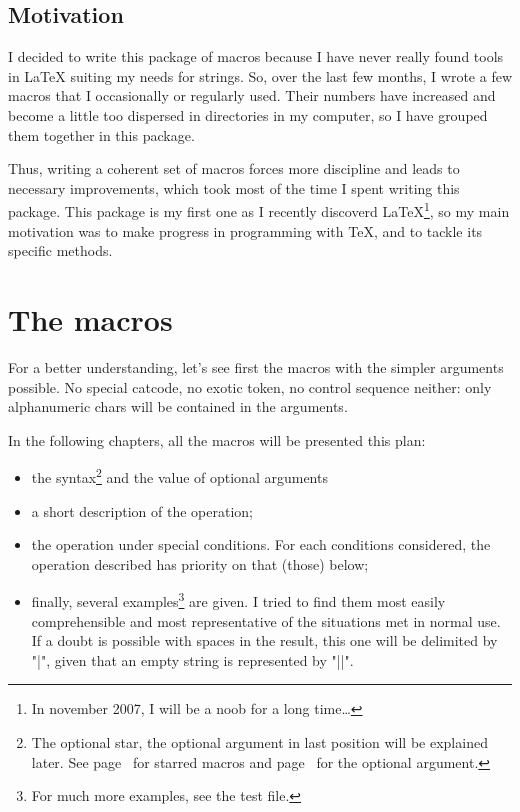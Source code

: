 \documentclass[english,a4paper,10pt]{article}
\newcommand\guill[1]{"#1"}
\begin{document}
\subsection{Motivation}
I decided to write this package of macros because I have never really found tools in \LaTeX{} suiting my needs for strings. So, over the last few months, I wrote a few macros that I occasionally or regularly used. Their numbers have increased and become a little too dispersed in directories in my computer, so I have grouped them together in this package.

Thus, writing a coherent set of macros forces more discipline and leads to necessary improvements, which took most of the time I spent writing this package. This package is my first one as I recently discoverd \LaTeX{}\footnote{In november 2007, I will be a noob for a long time\ldots}, so my main motivation was to make progress in programming with \TeX, and to tackle its specific methods.

\section{The macros}
For a better understanding, let's see first the macros with the simpler arguments possible. No special catcode, no exotic token, no control sequence neither: only alphanumeric chars will be contained in the arguments.\medskip

In the following chapters, all the macros will be presented this plan:
\begin{itemize}
	\item the syntax\footnote{The optional star, the optional argument in last position will be explained later. See page~\pageref{macrosetoilees} for starred macros and  page~\pageref{argumentoptionnel} for the optional argument.} and the value of optional arguments
	\item a short description of the operation;
	\item the operation under special conditions. For each conditions considered, the operation described has priority on that (those) below;
	\item finally, several examples\footnote{For much more examples, see the test file.} are given. I tried to find them most easily comprehensible and most representative of the situations met in normal use. If a doubt is possible with spaces in the result, this one will be delimited by \guill{|}, given that an empty string is represented by \guill{||}.
\end{itemize}\smallskip
\end{document}
